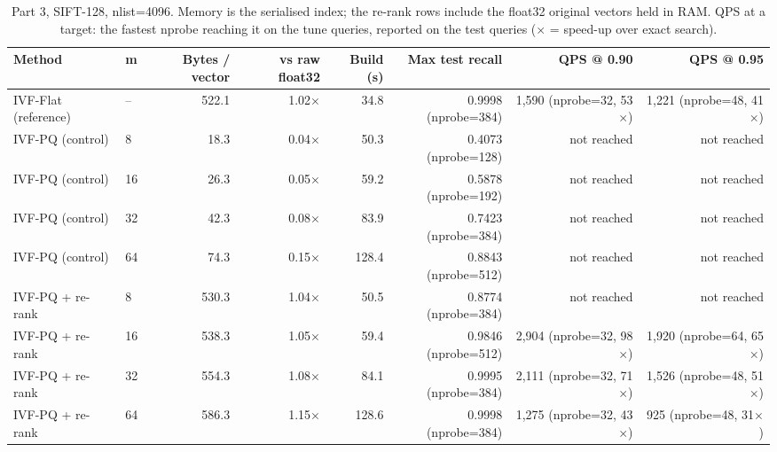 \begin{table}[t]
\centering
\small
\caption{Part 3, SIFT-128, nlist=4096. Memory is the serialised index; the re-rank rows include the float32 original vectors held in RAM. QPS at a target: the fastest nprobe reaching it on the tune queries, reported on the test queries ($\times$ = speed-up over exact search).}
\label{tab:t3a_compression_summary}
\begin{tabular}{llrrrrrr}
\toprule
Method & m & Bytes / vector & vs raw float32 & Build (s) & Max test recall & QPS @ 0.90 & QPS @ 0.95 \\
\midrule
IVF-Flat (reference) & -- & 522.1 & 1.02$\times$ & 34.8 & 0.9998 (nprobe=384) & 1,590 (nprobe=32, 53$\times$) & 1,221 (nprobe=48, 41$\times$) \\
IVF-PQ (control) & 8 & 18.3 & 0.04$\times$ & 50.3 & 0.4073 (nprobe=128) & not reached & not reached \\
IVF-PQ (control) & 16 & 26.3 & 0.05$\times$ & 59.2 & 0.5878 (nprobe=192) & not reached & not reached \\
IVF-PQ (control) & 32 & 42.3 & 0.08$\times$ & 83.9 & 0.7423 (nprobe=384) & not reached & not reached \\
IVF-PQ (control) & 64 & 74.3 & 0.15$\times$ & 128.4 & 0.8843 (nprobe=512) & not reached & not reached \\
IVF-PQ + re-rank & 8 & 530.3 & 1.04$\times$ & 50.5 & 0.8774 (nprobe=384) & not reached & not reached \\
IVF-PQ + re-rank & 16 & 538.3 & 1.05$\times$ & 59.4 & 0.9846 (nprobe=512) & 2,904 (nprobe=32, 98$\times$) & 1,920 (nprobe=64, 65$\times$) \\
IVF-PQ + re-rank & 32 & 554.3 & 1.08$\times$ & 84.1 & 0.9995 (nprobe=384) & 2,111 (nprobe=32, 71$\times$) & 1,526 (nprobe=48, 51$\times$) \\
IVF-PQ + re-rank & 64 & 586.3 & 1.15$\times$ & 128.6 & 0.9998 (nprobe=384) & 1,275 (nprobe=32, 43$\times$) & 925 (nprobe=48, 31$\times$) \\
\bottomrule
\end{tabular}
\end{table}
